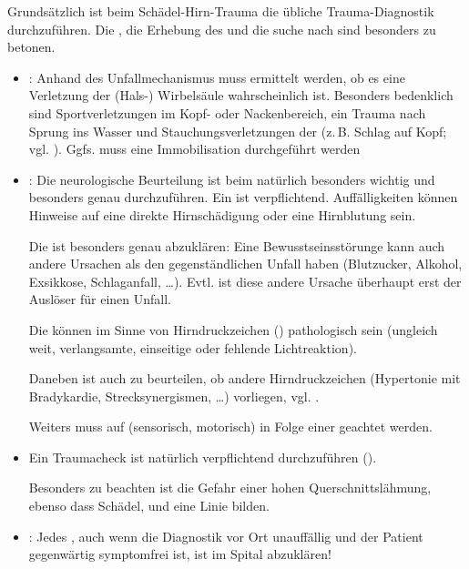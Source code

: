 {\label{topic:sht-diagnostik}%
Grundsätzlich ist beim Schädel-Hirn-Trauma die übliche
Trauma-Diagnostik durchzuführen. Die , die Erhebung des  und die
suche nach  sind
besonders zu betonen.

\begin{itemize}
  \item {}: Anhand des
  Unfallmechanismus muss ermittelt werden, ob es eine
  Verletzung der (Hals-) Wirbelsäule wahrscheinlich ist.
  Besonders bedenklich sind Sportverletzungen im Kopf- oder
  Nackenbereich, ein Trauma nach Sprung ins Wasser und
  Stauchungsverletzungen der  (z.\,B. Schlag auf
  Kopf;
  vgl.
  ).
  Ggfs. muss eine Immobilisation durchgeführt werden
  \item {}:
  Die neurologische Beurteilung ist beim  natürlich
  besonders wichtig und besonders genau durchzuführen. Ein
   ist verpflichtend. Auffälligkeiten können
  Hinweise auf eine direkte Hirnschädigung oder eine Hirnblutung sein.
  
  Die
   ist besonders genau abzuklären: Eine
  Bewusstseinsstörunge kann auch andere
  Ursachen als den gegenständlichen Unfall haben (Blutzucker,
  Alkohol, Exsikkose, Schlaganfall, \ldots). Evtl. ist diese
  andere Ursache überhaupt erst der Auslöser für einen Unfall.
  
  Die  können im Sinne von Hirndruckzeichen
  () pathologisch sein
  (ungleich weit, verlangsamte, einseitige oder fehlende
  Lichtreaktion).
  
  Daneben ist auch zu beurteilen, ob andere Hirndruckzeichen
  (Hypertonie mit Bradykardie, Strecksynergismen, \ldots)
  vorliegen, vgl. .
  
  Weiters muss auf  (sensorisch,
  motorisch) in Folge einer  geachtet
  werden.
  
  \item {} Ein Traumacheck ist natürlich
  verpflichtend durchzuführen
  ().
  
  Besonders zu beachten ist die Gefahr einer hohen
  Querschnittslähmung, ebenso dass Schädel,  und
   eine
  Linie bilden.
  
  \item {}: Jedes , auch wenn die
  Diagnostik vor Ort unauffällig und der Patient gegenwärtig
  symptomfrei ist, ist im Spital abzuklären!
\end{itemize}
}%
